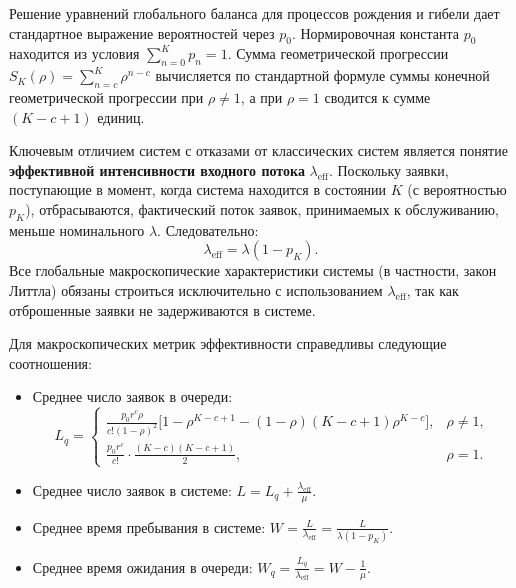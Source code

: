 \begin{sproof}
Решение уравнений глобального баланса для процессов рождения и гибели дает стандартное выражение вероятностей через $p_0$. Нормировочная константа $p_0$ находится из условия $\sum_{n=0}^K p_n = 1$. Сумма геометрической прогрессии $S_K(\rho) = \sum_{n=c}^{K} \rho^{n-c}$ вычисляется по стандартной формуле суммы конечной геометрической прогрессии при $\rho \ne 1$, а при $\rho = 1$ сводится к сумме $(K - c + 1)$ единиц.
\end{sproof}

\begin{note}
Ключевым отличием систем с отказами от классических систем является понятие \textbf{эффективной интенсивности входного потока} $\lambda_{\text{eff}}$. Поскольку заявки, поступающие в момент, когда система находится в состоянии $K$ (с вероятностью $p_K$), отбрасываются, фактический поток заявок, принимаемых к обслуживанию, меньше номинального $\lambda$. Следовательно:
$$
\lambda_{\text{eff}} = \lambda (1 - p_K).
$$
Все глобальные макроскопические характеристики системы (в частности, закон Литтла) обязаны строиться исключительно с использованием $\lambda_{\text{eff}}$, так как отброшенные заявки не задерживаются в системе.
\end{note}

\begin{statement}
Для макроскопических метрик эффективности справедливы следующие соотношения:
\begin{itemize}
    \item Среднее число заявок в очереди: 
    $$ L_q = \begin{cases}
    \displaystyle \frac{p_0 r^c \rho}{c! (1 - \rho)^2} \Big[ 1 - \rho^{K-c+1} - (1 - \rho) (K - c + 1) \rho^{K-c} \Big], & \rho \ne 1, \\
    \displaystyle \frac{p_0 r^c}{c!} \cdot \frac{(K - c)(K - c + 1)}{2}, & \rho = 1.
    \end{cases} $$
    \item Среднее число заявок в системе: $\displaystyle L = L_q + \frac{\lambda_{\text{eff}}}{\mu}$.
    \item Среднее время пребывания в системе: $\displaystyle W = \frac{L}{\lambda_{\text{eff}}} = \frac{L}{\lambda(1 - p_K)}$.
    \item Среднее время ожидания в очереди: $\displaystyle W_q = \frac{L_q}{\lambda_{\text{eff}}} = W - \frac{1}{\mu}$.
\end{itemize}
\end{statement}

